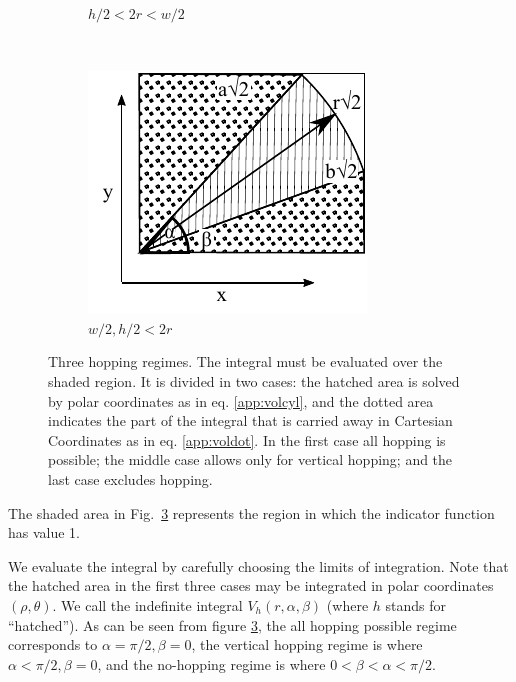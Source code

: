 \documentclass[superscriptaddress,pre,reprint,showpacs,twocolumn]{revtex4-1}
\begin{document}
\begin{figure}[h]
\begin{subfigure}[b]{0.32\textwidth}
          \caption{$h/2<2r<w/2$}
          \label{Caso2}
        \end{subfigure}%
        ~ %
        \begin{subfigure}[b]{0.32\textwidth}
          \centering
          \includegraphics[width=\textwidth]{figures/DiagramaIntegraCaso3.pdf}
          \caption{$w/2,h/2<2r$}
          \label{Caso3}
        \end{subfigure}%
        \caption{Three hopping regimes.
          The integral must be evaluated over the shaded region.
          It is divided in two cases: 
           the hatched area is
          solved by polar coordinates as in eq. \ref{app:volcyl},
          and the dotted area indicates the part of the integral
          that is carried away in Cartesian Coordinates as in eq.
          \ref{app:voldot}.
          In the first case all hopping is possible; the middle case
          allows only for vertical hopping; and the last case excludes hopping.}
\label{CasosIntegra}
\end{figure}
The shaded area in Fig.~\ref{CasosIntegra} represents the region in which the indicator function
has value 1. 

We evaluate the integral by carefully choosing the limits of integration. Note
that the hatched area in the first three cases may be integrated in polar coordinates $(\rho, \theta)$.
We call the indefinite integral $V_h(r,\alpha,\beta)$ (where $h$ stands for ``hatched'').
As can be seen from figure \ref{CasosIntegra}, the all hopping possible regime
corresponds to $\alpha = \pi/2, \beta=0$, the vertical hopping regime is where
$\alpha < \pi/2, \beta=0$, and the no-hopping regime is where $0 < \beta< \alpha < \pi/2$.
\end{document}
